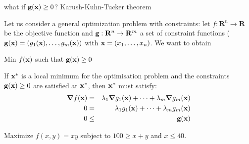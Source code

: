 \documentclass[c]{beamer}
\begin{document}
\begin{frame}{what if $\textbf{g}(\textbf{x})\geq 0$? Karush-Kuhn-Tucker theorem}

  Let us consider a general optimization problem with constraints: let $f:\mathbf{R}^n \rightarrow \mathbf{R}$ be the objective function and $\textbf{g}:\mathbf{R}^n \rightarrow \mathbf{R}^m$ a set of constraint functions ($\textbf{g}(\textbf{x})=(g_1(\textbf{x}),\ldots,g_m(\textbf{x}))$ with $\textbf{x}=(x_1,\ldots,x_n)$. We want to obtain
  \begin{center}
  Min $f(\textbf{x})$ such that $\textbf{g}(\textbf{x})\geq 0$
\end{center}
  \begin{theorem}
    If $\textbf{x}^*$ is a local minimum for the optimisation problem and the constraints $\textbf{g}(\textbf{x})\geq 0$ are satisfied at $\textbf{x}^*$, then $\textbf{x}^*$ must satisfy:
    \begin{eqnarray*}
      \grad f({\textbf{x}})&=&\lambda_1 \grad g_1(\textbf{x})+\cdots+\lambda_m \grad g_m(\textbf{x})\\
      0&=&\lambda_1  g_1(\textbf{x})+\cdots+\lambda_m  g_m(\textbf{x})\\
      0&\leq&\textbf{g}(\textbf{x})
    \end{eqnarray*}
  \end{theorem}

\end{frame}


\begin{frame}[allowframebreaks]
    \begin{Exercise}
  Maximize $f(x,y)=xy$ subject to $100 \geq x+y$ and $x\leq 40$.
\end{Exercise}
\end{frame}


\end{document}
